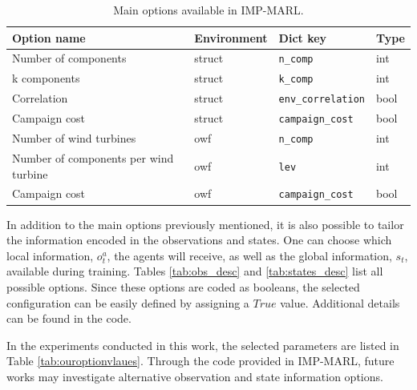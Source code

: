 \begin{table}
\centering
\caption{Main options available in IMP-MARL.}
\label{tab:optionsEnv}
\begin{tabular}{llll}
\toprule
Option name & Environment & Dict key & Type   \\
\midrule
Number of components & struct & \texttt{n\_comp} & int   \\ 
k components & struct & \texttt{k\_comp} & int     \\
Correlation & struct & \texttt{env\_correlation} & bool    \\ 
Campaign cost & struct & \texttt{campaign\_cost} & bool     \\
\hline 
Number of wind turbines & owf & \texttt{n\_comp} & int   \\ 
Number of components per wind turbine & owf & \texttt{lev} & int    \\
Campaign cost & owf & \texttt{campaign\_cost} & bool \\
\bottomrule
\end{tabular}
\end{table}


In addition to the main options previously mentioned, it is also possible to tailor the information encoded in the observations and states.
One can choose which local information, $o^a_t$, the agents will receive, as well as the global information, $s_t$, available during training. 
Tables \ref{tab:obs_desc} and \ref{tab:states_desc} list all possible options.
Since these options are coded as booleans, the selected configuration can be easily defined by assigning a $True$ value.
Additional details can be found in the code.

In the experiments conducted in this work, the selected parameters are listed in Table \ref{tab:ouroptionvlaues}. Through the code provided in IMP-MARL, future works may investigate alternative observation and state information options.


